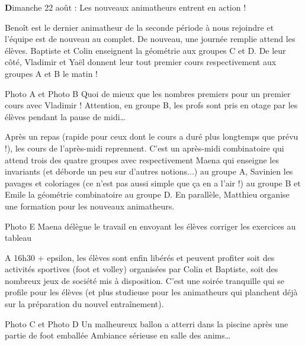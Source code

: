 \begin{center}
{\textbf Dimanche 22 août : Les nouveaux animatheurs entrent en action !}
\end{center}
\vspace{2mm}

Benoît est le dernier animatheur de la seconde période à nous rejoindre et l’équipe est de nouveau au complet. De nouveau, une journée remplie attend les élèves. Baptiste et Colin enseignent la géométrie aux groupes C et D. De leur côté, Vladimir et Yaël donnent leur tout premier cours respectivement aux groupes A et B le matin !

Photo A et Photo B
Quoi de mieux que les nombres premiers pour un premier cours avec Vladimir !
Attention, en groupe B, les profs sont pris en otage par les élèves pendant la pause de midi…

Après un repas (rapide pour ceux dont le cours a duré plus longtemps que prévu !), les cours de l’après-midi reprennent. C’est un après-midi combinatoire qui attend trois des quatre groupes avec respectivement Maena qui enseigne les invariants (et déborde un peu sur d’autres notions...) au groupe A, Savinien les pavages et coloriages (ce n’est pas aussi simple que ça en a l’air !) au groupe B et Emile la géométrie combinatoire au groupe D. En parallèle, Matthieu organise une formation pour les nouveaux animatheurs.

Photo E
Maena délègue le travail en envoyant les élèves corriger les exercices au tableau

A 16h30 + epsilon, les élèves sont enfin libérés et peuvent profiter soit des activités sportives (foot et volley) organisées par Colin et Baptiste, soit des nombreux jeux de société mis à disposition. C’est une soirée tranquille qui se profile pour les élèves (et plus studieuse pour les animatheurs qui planchent déjà sur la préparation du nouvel entraînement).

Photo C et Photo D
Un malheureux ballon a atterri dans la piscine après une partie de foot emballée
Ambiance sérieuse en salle des anims…